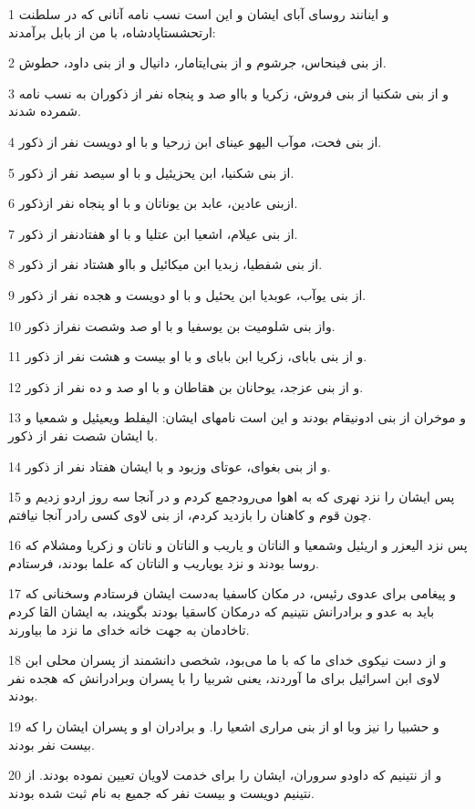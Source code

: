 \par 1 و اینانند روسای آبای ایشان و این است نسب نامه آنانی که در سلطنت ارتحشستاپادشاه، با من از بابل برآمدند:
\par 2 از بنی فینحاس، جرشوم و از بنی‌ایتامار، دانیال و از بنی داود، حطوش.
\par 3 و از بنی شکنیا از بنی فروش، زکریا و بااو صد و پنجاه نفر از ذکوران به نسب نامه شمرده شدند.
\par 4 از بنی فحت، موآب الیهو عینای ابن زرحیا و با او دویست نفر از ذکور.
\par 5 از بنی شکنیا، ابن یحزیئیل و با او سیصد نفر از ذکور.
\par 6 ازبنی عادین، عابد بن یوناتان و با او پنجاه نفر ازذکور.
\par 7 از بنی عیلام، اشعیا ابن عتلیا و با او هفتادنفر از ذکور.
\par 8 از بنی شفطیا، زبدیا ابن میکائیل و بااو هشتاد نفر از ذکور.
\par 9 از بنی یوآب، عوبدیا ابن یحئیل و با او دویست و هجده نفر از ذکور.
\par 10 واز بنی شلومیت بن یوسفیا و با او صد وشصت نفراز ذکور.
\par 11 و از بنی بابای، زکریا ابن بابای و با او بیست و هشت نفر از ذکور.
\par 12 و از بنی عزجد، یوحانان بن هقاطان و با او صد و ده نفر از ذکور.
\par 13 و موخران از بنی ادونیقام بودند و این است نامهای ایشان: الیفلط ویعیئیل و شمعیا و با ایشان شصت نفر از ذکور.
\par 14 و از بنی بغوای، عوتای وزبود و با ایشان هفتاد نفر از ذکور.
\par 15 پس ایشان را نزد نهری که به اهوا می‌رودجمع کردم و در آنجا سه روز اردو زدیم و چون قوم و کاهنان را بازدید کردم، از بنی لاوی کسی رادر آنجا نیافتم.
\par 16 پس نزد الیعزر و اریئیل وشمعیا و الناتان و یاریب و الناتان و ناتان و زکریا ومشلام که روسا بودند و نزد یویاریب و الناتان که علما بودند، فرستادم.
\par 17 و پیغامی برای عدوی رئیس، در مکان کاسفیا به‌دست ایشان فرستادم وسخنانی که باید به عدو و برادرانش نتینیم که درمکان کاسقیا بودند بگویند، به ایشان القا کردم تاخادمان به جهت خانه خدای ما نزد ما بیاورند.
\par 18 و از دست نیکوی خدای ما که با ما می‌بود، شخصی دانشمند از پسران محلی ابن لاوی ابن اسرائیل برای ما آوردند، یعنی شربیا را با پسران وبرادرانش که هجده نفر بودند.
\par 19 و حشبیا را نیز وبا او از بنی مراری اشعیا را. و برادران او و پسران ایشان را که بیست نفر بودند.
\par 20 و از نتینیم که داودو سروران، ایشان را برای خدمت لاویان تعیین نموده بودند. از نتینیم دویست و بیست نفر که جمیع به نام ثبت شده بودند.
